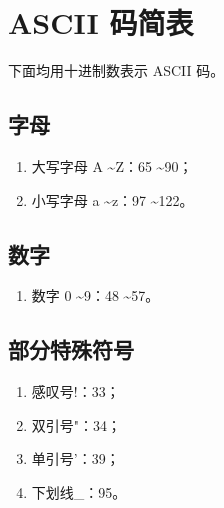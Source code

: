 \chapter{ASCII 码简表}

下面均用十进制数表示 ASCII 码。

\section{字母}

\begin{enumerate}
\item 大写字母 A \textasciitilde Z：65 \textasciitilde 90；
\item 小写字母 a \textasciitilde z：97 \textasciitilde 122。
\end{enumerate}

\section{数字}

\begin{enumerate}
\item 数字 0 \textasciitilde 9：48 \textasciitilde 57。
\end{enumerate}

\section{部分特殊符号}

\begin{enumerate}
\item 感叹号\quad!：33；
\item 双引号\quad"：34；
\item 单引号\quad'：39；
\item 下划线\quad\_：95。
\end{enumerate}